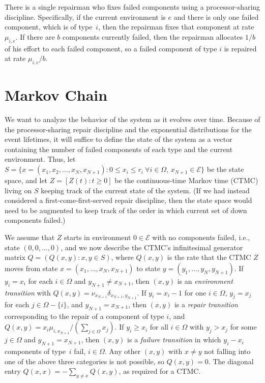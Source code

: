 \documentclass[12pt]{article}
\begin{document}
There is a single repairman who
fixes failed components using
a processor-sharing discipline.
Specifically, if the current
environment is $e$ and there
is only one failed component,
which is of type~$i$, then
the repairman fixes that component
at rate $\mu_{i,e}$.
If there are $b$ components currently failed,
then the repairman allocates $1/b$ of
his effort to each failed component,
so a failed component of type $i$ is
repaired at rate $\mu_{i,e}/b$.



\section{Markov Chain}
\label{sec:ctmc}


We want to analyze the behavior of the
system as it evolves over time.  Because of the
processor-sharing repair discipline
and the exponential distributions
for the event lifetimes,
it will suffice to define the
state of the system as a vector
containing
the
number of failed components of each type
and
the current environment.
Thus, let
$S = \{ x = (x_1, x_2, \ldots, x_N, x_{N+1}) :
0 \leq x_i \leq r_i \ \forall i \in \Omega, \,
x_{N+1} \in \mathcal{E}
 \}$
be the state space,
and let $Z = [Z(t) : t \geq 0]$
be the continuous-time Markov time (CTMC)
living on $S$ keeping track
of the current state of the system.
(If we had instead considered
a first-come-first-served repair
discipline, then the state
space would need to be augmented to
keep track of the order in which
current set of down components failed.)

We assume that $Z$ starts in
environment $0 \in \mathcal{E}$
with no
components failed, i.e., state
$(0,0, \ldots, 0)$, and we
now describe the CTMC's infinitesimal
generator matrix $Q = (Q(x,y) : x, y \in S)$,
where $Q(x,y)$ is the rate that
the CTMC $Z$ moves from state
$x = (x_1, \ldots, x_N, x_{N+1})$
to state $y = (y_1, \ldots, y_N, y_{N+1})$.
If
$y_i = x_i$ for each $i \in \Omega$
and
$y_{N+1} \neq x_{N+1}$,
then
$(x,y)$ is an \textit{environment transition}
with $Q(x,y) = \nu_{x_{N+1}} \delta_{x_{N+1},y_{N+1}}$.
If
$y_i = x_i - 1$ for one $i \in \Omega$,
$y_j = x_j$ for each $j \in \Omega - \{ i \}$,
and
$y_{N+1} = x_{N+1}$,
then $(x,y)$
is a \textit{repair transition}
corresponding to the repair
of a component of type $i$,
and
$Q(x,y) =
x_i \mu_{i,x_{N+1}}/(\sum_{j \in \Omega} x_j)$.
If
$y_i \geq x_i$ for all $i \in \Omega$
with $y_j > x_j$ for some $j \in \Omega$
and
$y_{N+1} = x_{N+1}$,
then $(x,y)$ is a
\textit{failure transition}
in which $y_i - x_i$ components
of type~$i$ fail, $i \in \Omega$.
Any other $(x,y)$ with $x \neq y$
not falling
into one of the above three categories
is not possible, so $Q(x,y) = 0$.
The diagonal entry $Q(x,x)
= -\sum_{y \neq x} Q(x,y)$,
as required for a CTMC.\@
\end{document}
